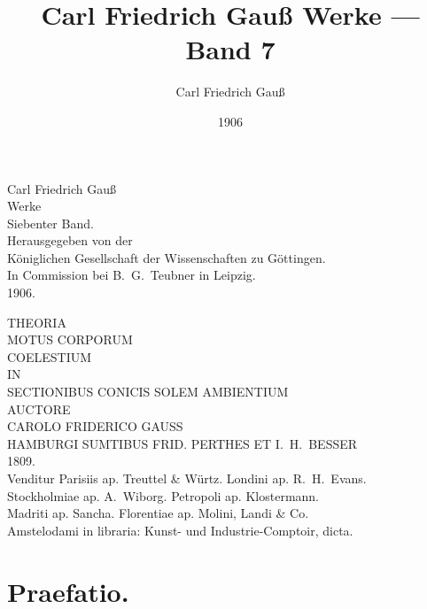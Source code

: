 \documentclass[12pt,a4paper]{book}
\title{Carl Friedrich Gau\ss{} Werke --- Band 7}
\author{Carl Friedrich Gau\ss}
\date{1906}
\begin{document}
\frontmatter
\maketitle

\thispagestyle{empty}
\begin{center}
\vspace*{3cm}
{\Huge Carl Friedrich Gau\ss}\\[0.8cm]
{\huge Werke}\\[0.4cm]
{\LARGE Siebenter Band.}\\[1.5cm]
{\large Herausgegeben von der}\\[0.2cm]
{\large K\"oniglichen Gesellschaft der Wissenschaften zu G\"ottingen.}\\[1cm]
{\large In Commission bei B.~G.~Teubner in Leipzig.}\\[1.5cm]
{\large 1906.}
\end{center}
\newpage
\thispagestyle{empty}
\null
\newpage

\mainmatter

\thispagestyle{empty}
\begin{center}
\vspace*{2cm}
{\LARGE THEORIA}\\[0.5cm]
{\Large MOTUS CORPORUM}\\[0.3cm]
{\Large COELESTIUM}\\[0.5cm]
{\large IN}\\[0.5cm]
{\Large SECTIONIBUS CONICIS SOLEM AMBIENTIUM}\\[1cm]
{\large AUCTORE}\\[0.3cm]
{\Large CAROLO FRIDERICO GAUSS}\\[0.8cm]
{\normalsize HAMBURGI SUMTIBUS FRID. PERTHES ET I.~H.~BESSER}\\[0.2cm]
{\normalsize 1809.}\\[1cm]
{\small Venditur Parisiis ap. Treuttel \& W\"urtz. Londini ap. R.~H.~Evans.\\
Stockholmiae ap. A.~Wiborg. Petropoli ap. Klostermann.\\
Madriti ap. Sancha. Florentiae ap. Molini, Landi \& Co.\\
Amstelodami in libraria: Kunst- und Industrie-Comptoir, dicta.}
\end{center}
\newpage
\thispagestyle{empty}
\null
\newpage

\chapter*{Praefatio.}
\end{document}
